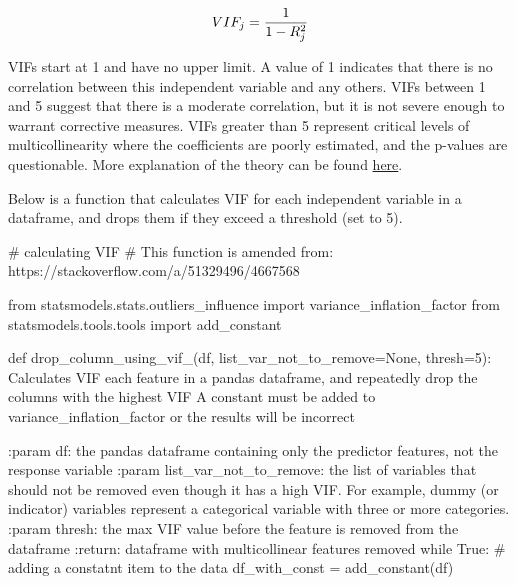 \documentclass[
  letterpaper,
  DIV=11,
  numbers=noendperiod]{scrreprt}
\newenvironment{Shaded}{\begin{snugshade}}{\end{snugshade}}
\newcommand{\CommentTok}[1]{\textcolor[rgb]{0.37,0.37,0.37}{#1}}
\newcommand{\ControlFlowTok}[1]{\textcolor[rgb]{0.00,0.23,0.31}{#1}}
\newcommand{\DecValTok}[1]{\textcolor[rgb]{0.68,0.00,0.00}{#1}}
\newcommand{\ImportTok}[1]{\textcolor[rgb]{0.00,0.46,0.62}{#1}}
\newcommand{\KeywordTok}[1]{\textcolor[rgb]{0.00,0.23,0.31}{#1}}
\newcommand{\NormalTok}[1]{\textcolor[rgb]{0.00,0.23,0.31}{#1}}
\newcommand{\OperatorTok}[1]{\textcolor[rgb]{0.37,0.37,0.37}{#1}}
\newcommand{\VariableTok}[1]{\textcolor[rgb]{0.07,0.07,0.07}{#1}}
\begin{document}
\[\large VIF_j=\frac{1}{1-R_{j}^{2}}\]

VIFs start at 1 and have no upper limit. A value of 1 indicates that
there is no correlation between this independent variable and any
others. VIFs between 1 and 5 suggest that there is a moderate
correlation, but it is not severe enough to warrant corrective measures.
VIFs greater than 5 represent critical levels of multicollinearity where
the coefficients are poorly estimated, and the p-values are
questionable. More explanation of the theory can be found
\href{https://en.wikipedia.org/wiki/Variance_inflation_factor}{here}.

Below is a function that calculates VIF for each independent variable in
a dataframe, and drops them if they exceed a threshold (set to 5).

\begin{Shaded}
\begin{Highlighting}[]
\CommentTok{\# calculating VIF}
\CommentTok{\# This function is amended from: https://stackoverflow.com/a/51329496/4667568}

\ImportTok{from}\NormalTok{ statsmodels.stats.outliers\_influence }\ImportTok{import}\NormalTok{ variance\_inflation\_factor }
\ImportTok{from}\NormalTok{ statsmodels.tools.tools }\ImportTok{import}\NormalTok{ add\_constant}

\KeywordTok{def}\NormalTok{ drop\_column\_using\_vif\_(df, list\_var\_not\_to\_remove}\OperatorTok{=}\VariableTok{None}\NormalTok{, thresh}\OperatorTok{=}\DecValTok{5}\NormalTok{):}
    \CommentTok{\textquotesingle{}\textquotesingle{}\textquotesingle{}}
\CommentTok{    Calculates VIF each feature in a pandas dataframe, and repeatedly drop the columns with the highest VIF}
\CommentTok{    A constant must be added to variance\_inflation\_factor or the results will be incorrect}

\CommentTok{    :param df: the pandas dataframe containing only the predictor features, not the response variable}
\CommentTok{    :param list\_var\_not\_to\_remove: the list of variables that should not be removed even though it has a high VIF. For example, dummy (or indicator) variables represent a categorical variable with three or more categories.}
\CommentTok{    :param thresh: the max VIF value before the feature is removed from the dataframe}
\CommentTok{    :return: dataframe with multicollinear features removed}
\CommentTok{    \textquotesingle{}\textquotesingle{}\textquotesingle{}}
    \ControlFlowTok{while} \VariableTok{True}\NormalTok{:}
        \CommentTok{\# adding a constatnt item to the data}
\NormalTok{        df\_with\_const }\OperatorTok{=}\NormalTok{ add\_constant(df)}


\end{Highlighting}
\end{Shaded}
\end{document}
